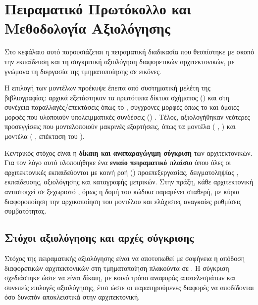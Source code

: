 \chapter{Πειραματικό Πρωτόκολλο και Μεθοδολογία Αξιο\-λόγησης}
\label{ch:experiments}

Στο κεφάλαιο αυτό παρουσιάζεται η πειραματική διαδικασία που θεσπίστηκε  
με σκοπό την εκπαίδευση και τη συγκριτική αξιολόγηση διαφορετικών αρχιτεκτονικών, 
με γνώμονα τη διεργασία της τμηματοποίησης σε  εικόνες.

Η επιλογή των μοντέλων προέκυψε έπειτα από συστηματική μελέτη της βιβλιογραφίας:
αρχικά εξετάστηκαν τα πρωτότυπα δίκτυα σχήματος  ()
\cite{ronneberger2015unet} και στη συνέχεια παραλ\-λαγές/επεκτάσεις όπως το
 \cite{oktay2018attentionunet}, σύγχρονες  μορφές
όπως το  \cite{isensee2021nnunet} και όμοιες  μορφές 
που υλοποιούν υπολειμματικές συνδέ\-σεις () \cite{myronenko2018segresnet}.
Τέλος, αξιολογήθηκαν νεότερες προσεγγίσεις που μοντελοποιούν μακρινές
εξαρτήσεις, όπως τα  μοντέλα
( \cite{hatamizadeh2022unetr},
 \cite{hatamizadeh2022swinunetr})
και  μοντέλα ( \cite{xing2024segmamba}, επέκταση του 
\cite{gu2023mamba}).

Κεντρικός στόχος είναι η \textbf{δίκαιη και αναπαραγώγιμη σύγκριση} των
αρχιτεκτονικών. Για τον λόγο αυτό υλοποιήθηκε ένα \textbf{ενιαίο πειραματικό
πλαίσιο} όπου όλες οι αρχιτεκτονικές εκπαιδεύονται με κοινή ροή
() προεπεξεργασίας, δειγματοληψίας , εκπαίδευσης,
αξιολόγησης και καταγραφής μετρικών.
Στην πράξη, κάθε αρχιτεκτονική αντι\-στοιχεί σε ξεχωριστό ,
όμως η δομή του κώδικα παραμένει σταθερή, με κύρια διαφοροποίηση την
αρχικοποίηση του μοντέλου και ελάχιστες αναγκαίες ρυθμίσεις συμβατότητας.

\section{Στόχοι αξιολόγησης και αρχές σύγκρισης}
\label{sec:exp_principles}

Στόχος της πειραματικής αξιολόγησης είναι να αποτυπωθεί με σαφήνεια η
απόδοση διαφορετικών αρχιτεκτονικών στη τμηματοποίηση
πλακούντα σε . Η σύγκριση σχεδιάστηκε ώστε να είναι δίκαιη, με
κοινό τρόπο αναφοράς αποτελεσμάτων και συνεπείς επιλογές αξιολόγησης, έτσι
ώστε οι παρατηρούμενες διαφορές να αποδίδονται όσο δυνατόν αποκλειστικά στην
αρχιτεκτονική.

